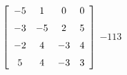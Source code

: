 {$\left[ \begin {array}{cccc} -5&1&0&0\\\noalign{\medskip}-3&-5&2&5
\\\noalign{\medskip}-2&4&-3&4\\\noalign{\medskip}5&4&-3&3\end {array}\right] 
$} 
{$-113$}

  

 

